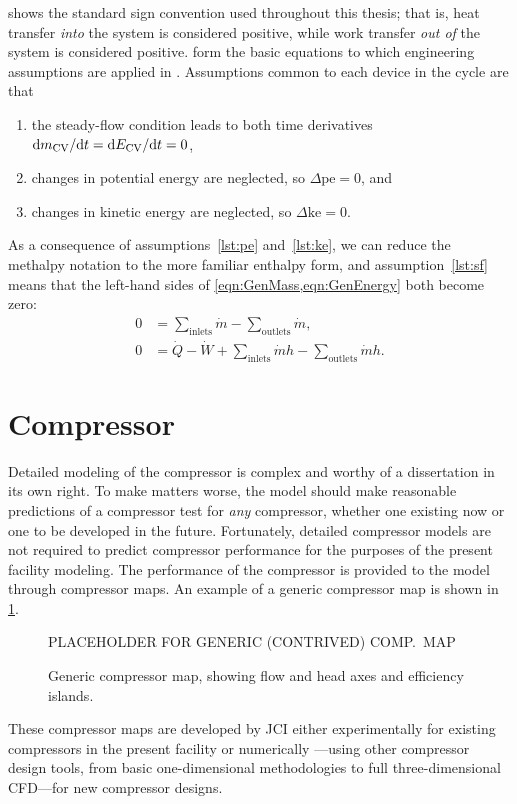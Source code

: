  shows the standard sign convention used throughout this thesis; 
that is, heat transfer \emph{into} the system is considered positive, 
while work transfer \emph{out of} the system is considered positive.
 form the basic equations to which 
engineering assumptions are applied in .
Assumptions common to each device in the cycle are that
\begin{enumerate}
  \item the steady-flow condition leads to both time derivatives $\mathop{}\!\mathrm{d}{m_{\mathrm{CV}}}/\!\mathop{}\!\mathrm{d}{t} = \mathop{}\!\mathrm{d}{E_{\mathrm{CV}}}/\!\mathop{}\!\mathrm{d}{t} = 0$, \label{lst:sf}
  \item changes in potential energy are neglected, so $\Delta \text{pe} = 0$, and \label{lst:pe}
  \item changes in kinetic energy are neglected, so $\Delta \text{ke} = 0$. \label{lst:ke}
\end{enumerate}
As a consequence of assumptions~\ref{lst:pe} and~\ref{lst:ke},
we can reduce the methalpy notation to the more familiar enthalpy form,
and assumption~\ref{lst:sf} means that the left-hand sides of \cref{eqn:GenMass,eqn:GenEnergy} both become zero:
\begin{align}
  0 &= \sum_{\text{inlets}}{\dot{m}} - \sum_{\text{outlets}}{\dot{m}}, \label{eqn:SemiMass}\\
  0 &= \dot{Q} - \dot{W} + \sum_{\text{inlets}}{\dot{m}h} - \sum_{\text{outlets}}{\dot{m}h}. \label{eqn:SemiEnergy}
\end{align}

\section{Compressor} \label{sec:Compressor}
Detailed modeling of the compressor is complex and worthy of a dissertation in its own right. 
To make matters worse, the model should make reasonable predictions 
of a compressor test for \emph{any} compressor, 
whether one existing now or one to be developed in the future.
Fortunately, detailed compressor models are not required 
to predict compressor performance for the purposes of the present facility modeling. 
The performance of the compressor is provided to the model through compressor maps. 
An example of a generic compressor map is shown in \cref{fig:GenMap}. 
\begin{figure}[htbp]
  \centering
  PLACEHOLDER FOR GENERIC (CONTRIVED) COMP.~MAP
  \caption{Generic compressor map, showing flow and head axes and efficiency islands.}
  \label{fig:GenMap}
\end{figure}
These compressor maps are developed by JCI either experimentally 
for existing compressors in the present facility or numerically%
---using other compressor design tools, from basic one-dimensional methodologies
to full three-dimensional CFD---for new compressor designs.

